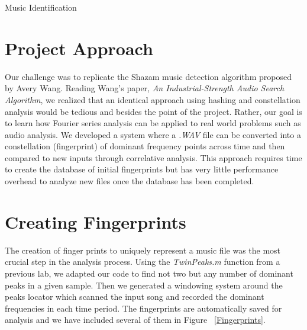 




%
%

\begin{Large}\begin{center}
Music Identification
\end{center}\end{Large}


%
%

\section{Project Approach}

Our challenge was to replicate the Shazam music detection algorithm proposed by Avery Wang. Reading Wang's paper, \textit{An Industrial-Strength Audio Search Algorithm}, we realized that an identical approach using hashing and constellation analysis would be tedious and besides the point of the project. Rather, our goal is to learn how Fourier series analysis can be applied to real world problems such as audio analysis. We developed a system where a \textit{.WAV} file can be converted into a constellation (fingerprint) of dominant frequency points across time and then compared to new inputs through correlative analysis. This approach requires time to create the database of initial fingerprints but has very little performance overhead to analyze new files once the database has been completed.


%
%

\section{Creating Fingerprints}

The creation of finger prints to uniquely represent a music file was the most crucial step in the analysis process. Using the \textit{TwinPeaks.m} function from a previous lab, we adapted our code to find not two but any number of dominant peaks in a given sample. Then we generated a windowing system around the peaks locator which scanned the input song and recorded the dominant frequencies in each time period. The fingerprints are automatically saved for analysis and we have included several of them in Figure ~\ref{Fingerprints}.

